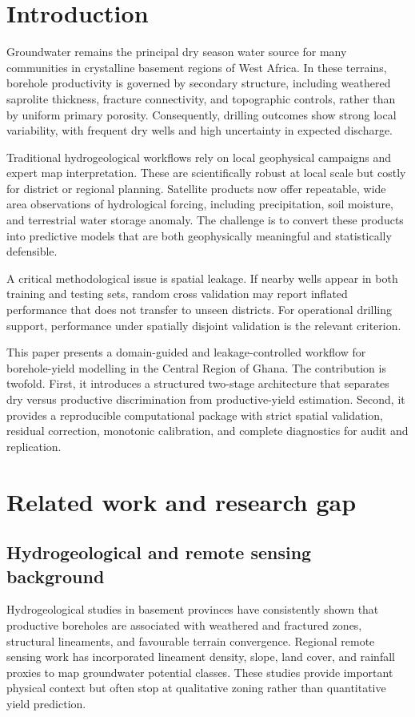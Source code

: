 \documentclass[preprint,12pt]{elsarticle}
\begin{document}
\section{Introduction}
Groundwater remains the principal dry season water source for many communities in crystalline basement regions of West Africa. In these terrains, borehole productivity is governed by secondary structure, including weathered saprolite thickness, fracture connectivity, and topographic controls, rather than by uniform primary porosity. Consequently, drilling outcomes show strong local variability, with frequent dry wells and high uncertainty in expected discharge.

Traditional hydrogeological workflows rely on local geophysical campaigns and expert map interpretation. These are scientifically robust at local scale but costly for district or regional planning. Satellite products now offer repeatable, wide area observations of hydrological forcing, including precipitation, soil moisture, and terrestrial water storage anomaly. The challenge is to convert these products into predictive models that are both geophysically meaningful and statistically defensible.

A critical methodological issue is spatial leakage. If nearby wells appear in both training and testing sets, random cross validation may report inflated performance that does not transfer to unseen districts. For operational drilling support, performance under spatially disjoint validation is the relevant criterion.

This paper presents a domain-guided and leakage-controlled workflow for borehole-yield modelling in the Central Region of Ghana. The contribution is twofold. First, it introduces a structured two-stage architecture that separates dry versus productive discrimination from productive-yield estimation. Second, it provides a reproducible computational package with strict spatial validation, residual correction, monotonic calibration, and complete diagnostics for audit and replication.

\section{Related work and research gap}
\subsection{Hydrogeological and remote sensing background}
Hydrogeological studies in basement provinces have consistently shown that productive boreholes are associated with weathered and fractured zones, structural lineaments, and favourable terrain convergence. Regional remote sensing work has incorporated lineament density, slope, land cover, and rainfall proxies to map groundwater potential classes. These studies provide important physical context but often stop at qualitative zoning rather than quantitative yield prediction.
\end{document}
